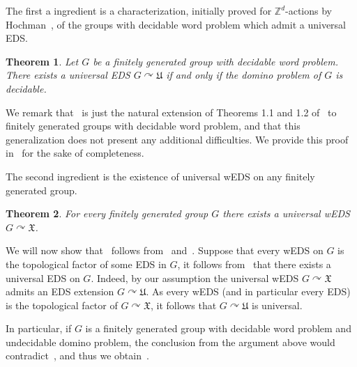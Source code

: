\documentclass{article}
\theoremstyle{definition}
\theoremstyle{plain}
\newtheorem{thmx}{Theorem}
\newcommand{\ZZ}{\mathbb{Z}}
\begin{document}
The first a ingredient is a characterization, initially proved for $\ZZ^d$-actions by Hochman~\cite{Hochman2009}, of the groups with decidable word problem which admit a universal EDS.

\begin{thmx}\label{mainthm:hochmanv2}
    Let $G$ be a finitely generated group with decidable word problem. There exists a universal EDS $G\curvearrowright \mathfrak{U}$ if and only if the domino problem of $G$ is decidable.
\end{thmx}

We remark that~ is just the natural extension of Theorems 1.1 and 1.2 of~\cite{Hochman2009} to finitely generated groups with decidable word problem, and that this generalization does not present any additional difficulties. We provide this proof in~ for the sake of completeness.

The second ingredient is the existence of universal wEDS on any finitely generated group.



\begin{thmx}\label{mainthm:universalweds}
    For every finitely generated group $G$ there exists a universal wEDS $G\curvearrowright \mathfrak{X}$.
\end{thmx}

We will now show that~ follows from~ and~. Suppose that every wEDS on $G$ is the topological factor of some EDS in $G$, it follows from~ that there exists a universal EDS on $G$. Indeed, by our assumption the universal wEDS $G\curvearrowright \mathfrak{X}$ admits an EDS extension $G\curvearrowright \mathfrak{U}$. As every wEDS (and in particular every EDS) is the topological factor of $G\curvearrowright \mathfrak{X}$, it follows that $G\curvearrowright \mathfrak{U}$ is universal.

In particular, if $G$ is a finitely generated group with decidable word problem and undecidable domino problem, the conclusion from the argument above would contradict~, and thus we obtain~.

\end{document}
